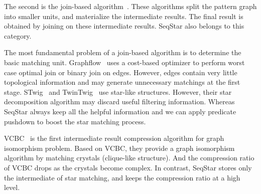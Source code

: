 The second is the join-based algorithm~\cite{DBLP:journals/pvldb/LaiQLC15,DBLP:journals/pvldb/QiaoZC17,DBLP:journals/pvldb/SunWWSL12,DBLP:journals/pvldb/MhedhbiS19,DBLP:journals/pvldb/MhedhbiS19}.
These algorithms split the pattern graph into smaller units,
and materialize the intermediate results.
The final result is obtained by joining on these intermediate results.
SeqStar also belongs to this category.

The most fundamental problem of a join-based algorithm is to determine the basic matching unit.
Graphflow~\cite{DBLP:journals/pvldb/MhedhbiS19} uses a cost-based optimizer to perform worst case optimal join or binary join on edges.
However, edges contain very little topological information and may generate unnecessary matchings at the first stage.
STwig~\cite{DBLP:journals/pvldb/SunWWSL12} and TwinTwig~\cite{DBLP:journals/pvldb/LaiQLC15} use star-like structures.
However, their star decomposition algorithm may discard useful filtering information.
Whereas SeqStar always keep all the helpful information and we can apply predicate pushdown to boost the star matching process.

VCBC~\cite{DBLP:journals/pvldb/QiaoZC17} is the first intermediate result compression algorithm for graph isomorphism problem.
Based on VCBC, they provide a graph isomorphism algorithm by matching crystals (clique-like structure).
And the compression ratio of VCBC drops as the crystals become complex.
In contrast, SeqStar stores only the intermediate of star matching, and keeps the compression ratio at a high level.

